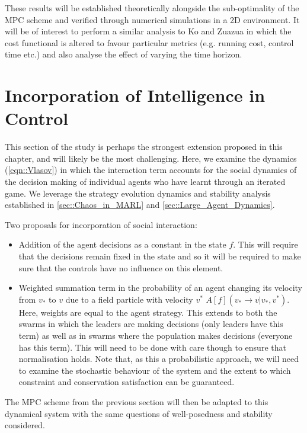 \documentclass[.../main.tex]{subfiles}
\begin{document}
	These results will be established theoretically alongside the sub-optimality of the MPC scheme
	and verified through numerical simulations in a 2D environment. It
    will be of interest to perform a similar analysis to Ko and Zuazua \cite{Ko2019} in which the
    cost functional is altered to favour particular metrics  (e.g. running cost, control time etc.)
    and also analyse the effect of varying the time horizon.

    \section{Incorporation of Intelligence in Control} \label{sec::Intelligence_in_control}

    This section of the study is perhaps the strongest extension
    proposed in this chapter, and will likely be the most
    challenging. Here, we examine the dynamics (\ref{eqn::Vlasov}) in
    which the interaction term accounts for the social dynamics of the
    decision making of individual agents who have learnt through an
    iterated game. We leverage the strategy evolution dynamics and
    stability analysis established in \ref{sec::Chaos_in_MARL} and
    \ref{sec::Large_Agent_Dynamics}.

	Two proposals for incorporation of social interaction:
	\begin{itemize}
		\item Addition of the agent decisions as a constant in the state $f$. This will require that
		the decisions remain fixed in the state and so it will be required to make sure that the
		controls have no influence on this element.
		\item Weighted summation term in the probability of an agent changing its velocity from
		$v_*$ to
		$v$ due to a field particle with velocity $v^*$ $A[f](v_* \rightarrow v | v_*, v^*)$.
		Here, weights are equal to the agent strategy. This extends to both the swarms in
		which the leaders are making decisions (only leaders have this term) as well as in
		swarms where the population makes decisions (everyone has this term). This will need to be
		done with care though to ensure that normalisation holds. Note that, as this a probabilistic
		approach, we will need to examine the stochastic behaviour of the system and the extent to
		which constraint and conservation satisfaction can be guaranteed.
	\end{itemize}

	The MPC scheme from the previous section will then be adapted to this dynamical system with the
	same questions of well-posedness and stability considered. 
\end{document}
